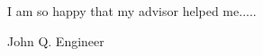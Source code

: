 %
%
%
%
%

\begin{acknowledgments} 
I am so happy that my advisor helped me.....
\\
\begin{flushright} 
John Q. Engineer 
\end{flushright}
\end{acknowledgments}

